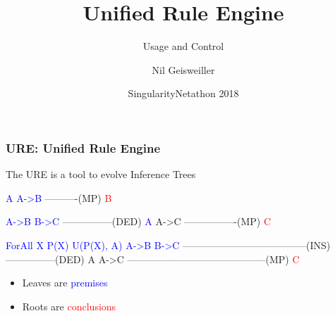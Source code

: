 \documentclass{beamer}
\title{Unified Rule Engine}
\subtitle{Usage and Control}
\author{Nil Geisweiller}
\institute[OpenCog Foundation] %
{
  OpenCog Foundation
}
\date[SingularityNetathon 2018] %
{SingularityNetathon 2018}
\begin{document}
\frame
{
  \maketitle
}


\begin{frame}[fragile]
  \frametitle{URE: Unified Rule Engine}
  The URE is a tool to \alert{evolve Inference Trees}
{\tiny \begin{semiverbatim}
\textcolor{blue}{A  A->B}
----------(MP)      
   \textcolor{red}{B}
\end{semiverbatim}}

{\tiny \begin{semiverbatim}
    \textcolor{blue}{A->B  B->C}
    ---------------(DED)
\textcolor{blue}{A}      A->C       
----------------(MP)   
     \textcolor{red}{C}
\end{semiverbatim}}

{\tiny \begin{semiverbatim}
\textcolor{blue}{ForAll X P(X)  U(P(X), A)        A->B  B->C}
--------------------------------------(INS)   ---------------(DED)
            A                       A->C       
            ------------------------------------------(MP)
                           \textcolor{red}{C}
\end{semiverbatim}}

\begin{itemize}
\item Leaves are \textcolor{blue}{premises}
\item Roots are \textcolor{red}{conclusions}
\end{itemize}
  
\end{frame}
\end{document}

